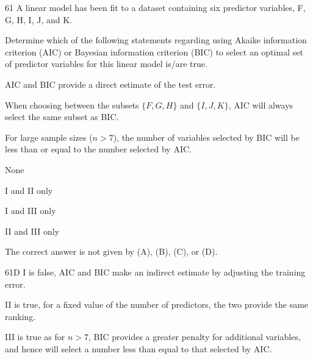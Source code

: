 \begin{question}{61}
A linear model has been fit to a dataset containing six predictor variables, F, G, H, I, J, and K.

Determine which of the following statements regarding using Akaike information criterion (AIC) or Bayesian information criterion (BIC) to select an optimal set of predictor variables for this linear model is/are true.

\begin{statements}
\item AIC and BIC provide a direct estimate of the test error.
\item When choosing between the subsets $\{F, G, H\}$ and $\{I, J, K\}$, AIC will always select the same subset as BIC.
\item For large sample sizes ($n > 7$), the number of variables selected by BIC will be less than or equal to the number selected by AIC.
\end{statements}

\begin{choices}
\item None
\item I and II only
\item I and III only
\item II and III only
\item The correct answer is not given by (A), (B), (C), or (D).
\end{choices}
\end{question}
\begin{solution}{61}{D}
I is false, AIC and BIC make an indirect estimate by adjusting the training error.

II is true, for a fixed value of the number of predictors, the two provide the same ranking.

III is true as for $n > 7$, BIC provides a greater penalty for additional variables, and hence will select a number less than equal to that selected by AIC.
\end{solution}

